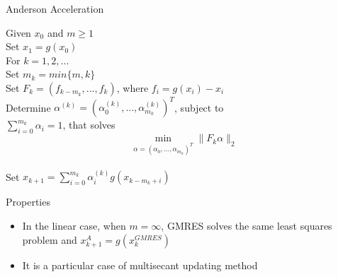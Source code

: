 \documentclass{beamer}
\begin{document}
				
				\begin{frame}{Anderson Acceleration \hypersetup{linkcolor=white}\cite{p5}\hypersetup{linkcolor=blue}}
					
					Given $x_0$ and $m \geq 1$\\
					Set $x_1 = g(x_0)$\\
					For $k = 1, 2, ...$\\
					\hspace*{16pt} Set $m_k = min\{m, k\}$\\
					\hspace*{20pt}Set $F_k = (f_{k-m_k}, ... , f_k)$, where $f_i = g(x_i)-x_{i}$\\
					\hspace*{20pt}Determine $\alpha^{(k)} = (\alpha^{(k)}
					_0 , ..., \alpha^{(k)}_{m_k} )^T$, subject to\\ \hspace*{20pt}$\sum^{m_k}_{i=0} {\alpha_i = 1}$, that solves
					$$\min_{\alpha=(\alpha_0,...,\alpha_{m_k} )^T} \|F_k \alpha\|_2$$\\
					\hspace*{20pt}Set $x_{k+1} =\sum^{m_k}
					_{i=0} {\alpha_i^{(k)} g(x_{k-m_{k}+i})}$    
				\end{frame}
				
				\begin{frame}{Properties}
					\begin{itemize}
						\item In the linear case, when $m = \infty$, GMRES solves the same least squares problem and $x_{k+1}^A = g(x_k^{GMRES})$
						\item It is a particular case of multisecant updating method \cite{p3}
					\end{itemize}
					
					
				\end{frame}
				
\end{document}
